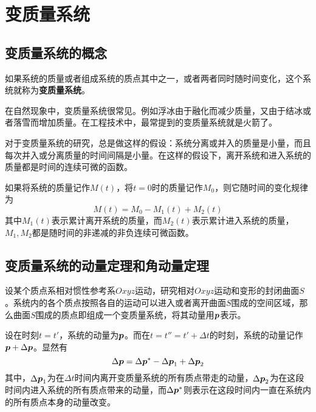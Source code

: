 \section{变质量系统}

\subsection{变质量系统的概念}

如果系统的质量或者组成系统的质点其中之一，或者两者同时随时间变化，这个系统就称为{\bf 变质量系统}。

在自然现象中，变质量系统很常见。例如浮冰由于融化而减少质量，又由于结冰或者落雪而增加质量。在工程技术中，最常提到的变质量系统就是火箭了。

对于变质量系统的研究，总是做这样的假设：系统分离或并入的质量是小量，而且每次并入或分离质量的时间间隔是小量。在这样的假设下，离开系统和进入系统的质量都是时间的连续可微的函数。

如果将系统的质量记作$M(t)$，将$t=0$时的质量记作$M_0$，则它随时间的变化规律为
\begin{equation}
	M(t) = M_0 - M_1(t) + M_2(t)
	\label{chapter1:变质量系统的质量关系}
\end{equation}
其中$M_1(t)$表示累计离开系统的质量，而$M_2(t)$表示累计进入系统的质量，$M_1,M_2$都是随时间的非递减的非负连续可微函数。

\subsection{变质量系统的动量定理和角动量定理}

设某个质点系相对惯性参考系$Oxyz$运动，研究相对$Oxyz$运动和变形的封闭曲面$S$。系统内的各个质点按照各自的运动可以进入或者离开曲面$S$围成的空间区域，那么曲面$S$围成的质点即组成一个变质量系统，将其动量用$\boldsymbol{p}$表示。

设在时刻$t=t'$，系统的动量为$\boldsymbol{p}$。而在$t=t''=t'+\Delta t$的时刻，系统的动量记作$\boldsymbol{p}+\Delta \boldsymbol{p}$。显然有
\begin{equation}
	\Delta \boldsymbol{p} = \Delta \boldsymbol{p}^*-\Delta \boldsymbol{p}_1+\Delta \boldsymbol{p}_2
	\label{chapter1:变质量系统的动量定理-初步}
\end{equation}
其中，$\Delta\boldsymbol{p}_1$为在$\Delta t$时间内离开变质量系统的所有质点带走的动量，$\Delta\boldsymbol{p}_2$为在这段时间内进入系统的所有质点带来的动量，而$\Delta\boldsymbol{p}^*$则表示在这段时间内一直在系统内的所有质点本身的动量改变。

